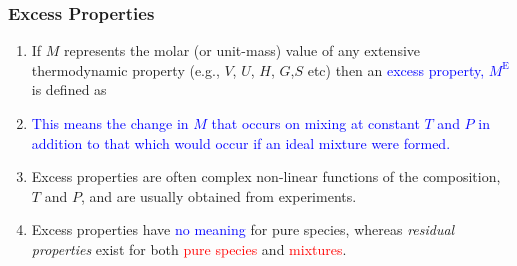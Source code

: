 \documentclass[10pt,compress,handout]{beamer}
\newcommand{\red}{\textcolor{red}}
\newcommand{\blue}{\textcolor{blue}}
\begin{document}
\begin{frame}
  \frametitle{Excess Properties}
  \begin{enumerate}%
      \item<1-> If $M$ represents the molar (or unit-mass) value of any extensive thermodynamic property (e.g., $V$, $U$, $H$, $G$,$S$ etc) then an \blue{excess property, $M^{\text{E}}$} is defined as
      \item<2-> \blue{This means the change in $M$ that occurs on mixing at constant $T$ and $P$ in addition to that which would occur if an ideal mixture were formed.}
      \item<3-> Excess properties are often complex non-linear functions of the composition, $T$ and $P$, and are usually obtained from experiments.
      \item<4-> Excess properties have \blue{no meaning} for pure species, whereas {\it residual properties} exist for both \red{pure species} and \red{mixtures}.
  \end{enumerate}
\end{frame}
\normalsize
\end{document}
